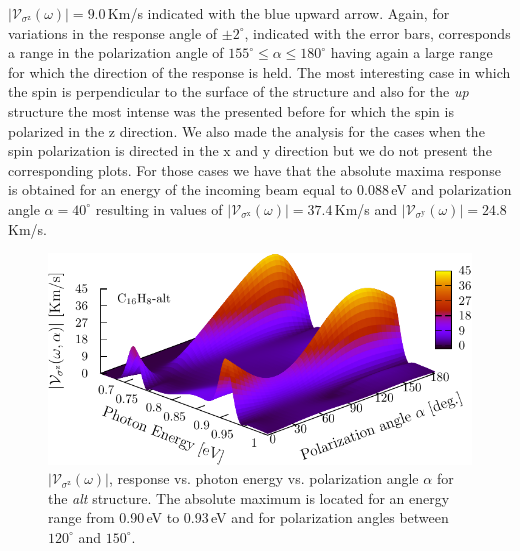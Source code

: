 \documentclass[prb,11pt,tightenlines,twocolumn,aps]{revtex4-1}
\begin{document}
$|\mathcal{V}_{\sigma^{\mathrm{z}}}(\omega)|=9.0$\,Km/s indicated with the blue
upward arrow. Again, for variations in the response angle of $\pm2^{\circ}$,
indicated with the error bars, corresponds a range in the polarization angle of
$155^{\circ} \leq \alpha \leq 180^{\circ}$ having again a large range for which
the direction of the response is held.
% 
% 
The most interesting case in which the spin is perpendicular to the surface of
the structure and also for the \emph{up} structure the most intense was the
presented before for which the spin is polarized in the $\mathrm{z}$ direction.
We also made the analysis for the cases when the spin polarization is directed
in the $\mathrm{x}$ and $\mathrm{y}$ direction but we do not present the
corresponding plots. For those cases we have that the absolute maxima response
is obtained for an energy of the incoming beam equal to 0.088\,eV and
polarization angle $\alpha=40^{\circ}$ resulting in values of
$|\mathcal{V}_{\sigma^{\mathrm{x}}}(\omega)|=37.4$\,Km/s and
$|\mathcal{V}_{\sigma^{\mathrm{y}}}(\omega)|=24.8$\,Km/s.



\begin{figure}[tb]
    \centering
    \includegraphics[width=\linewidth]{altplots/alt-3d-svaz}
    \caption{$|\mathcal{V}_{\sigma^{\mathrm{z}}}(\omega)|$, response
    vs. photon energy vs. polarization angle $\alpha$ for the \emph{alt}
    structure. The absolute maximum is located for an energy range from 0.90\,eV
    to 0.93\,eV and for polarization angles between $120^{\circ}$ and
    $150^{\circ}$.}
    \label{fig:alt-3d-vsb}
\end{figure}
\end{document}
